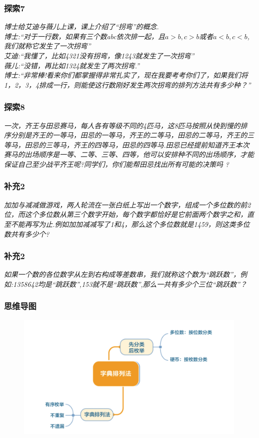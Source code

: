 \begin{frame}
    \frametitle{探索7}
    \vspace*{-2cm}
    \textit{博士给艾迪与薇儿上课，课上介绍了``拐弯''的概念.\\
    博士:``对于一行数，如果有三个数abc依次排一起，且$a > b, c > b$或者$a <b,c<b$,我们就称它发生了一次拐弯''\\
    艾迪:``我懂了，比如4321没有拐弯，像1243就发生了一次拐弯''\\
    薇儿:``没错，再比如1324就发生了两次拐弯.''\\
    博士:``非常棒!看来你们都掌握得非常扎实了，现在我要考考你们了，如果我们将1，2，3，4排成一行，则能使这行数刚好发生两次拐弯的排列方法共有多少种？''}
\end{frame}

\begin{frame}
    \frametitle{探索8}
    \vspace*{-2cm}
    \textit{一次，齐王与田忌赛马，每人各有等级不同的4匹马，这8匹马按照从快到慢的排序分别是齐王的一等马，田忌的一等马，齐王的二等马，田忌的二等马，齐王的三等马，田忌的三等马，齐王的四等马，田忌的四等马.田忌已经提前知道齐王本次赛马的出场顺序是一等、二等、三等、四等，他可以安排种不同的出场顺序，才能保证自己至少战平齐王呢?同学们，你们能帮田忌找出所有可能的决策吗 ?}
\end{frame}

\begin{frame}
    \frametitle{补充2}
    \textit{加加与减减做游戏，两人轮流在一张白纸上写出一个数字，组成一个多位数的前2位，而这个多位数从第三个数字开始，每个数字都恰好是它前面两个数字之和，直至不能再写为止.例如加加减减写了1和4，那么这个多位数就是1459，则这类多位数共有多少个?}
\end{frame}

\begin{frame}
    \frametitle{补充2}
    \textit{如果一个数的各位数字从左到右构成等差数串，我们就称这个数为“跳跃数”，例如:1358642均是“跳跃数”,153就不是“跳跃数”,那么一共有多少个三位“跳跃数”？}
\end{frame}

\begin{frame}
    \frametitle{思维导图}
    \begin{figure}[H] 
        \centering
        \includegraphics[width=1\textwidth]{./pics/Chapter_2/siweidaotu.png}
    \end{figure}
\end{frame}